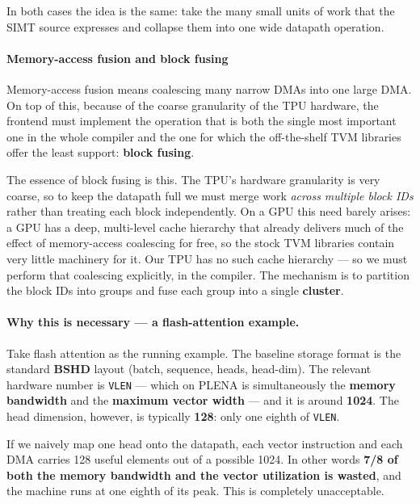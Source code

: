 \documentclass[
  10pt,
]{article}
\begin{document}
In both cases the idea is the same: take the many small units of work
that the SIMT source expresses and collapse them into one wide datapath
operation.

\paragraph{Memory-access fusion and block
fusing}\label{frontend-memory-access-fusion}

Memory-access fusion means coalescing many narrow DMAs into one large
DMA. On top of this, because of the coarse granularity of the TPU
hardware, the frontend must implement the operation that is both the
single most important one in the whole compiler and the one for which
the off-the-shelf TVM libraries offer the least support: \textbf{block
fusing}.

The essence of block fusing is this. The TPU's hardware granularity is
very coarse, so to keep the datapath full we must merge work \emph{across
multiple block IDs} rather than treating each block independently. On a
GPU this need barely arises: a GPU has a deep, multi-level cache
hierarchy that already delivers much of the effect of memory-access
coalescing for free, so the stock TVM libraries contain very little
machinery for it. Our TPU has no such cache hierarchy --- so we must
perform that coalescing explicitly, in the compiler. The mechanism is to
partition the block IDs into groups and fuse each group into a single
\textbf{cluster}.

\paragraph{Why this is necessary --- a flash-attention
example.}\label{frontend-why-block-fusing}

Take flash attention as the running example. The baseline storage format
is the standard \textbf{BSHD} layout (batch, sequence, heads, head-dim).
The relevant hardware number is \texttt{VLEN} --- which on PLENA is
simultaneously the \textbf{memory bandwidth} and the \textbf{maximum
vector width} --- and it is around \textbf{1024}. The head dimension,
however, is typically \textbf{128}: only one eighth of \texttt{VLEN}.

If we naively map one head onto the datapath, each vector instruction and
each DMA carries 128 useful elements out of a possible 1024. In other
words \textbf{7/8 of both the memory bandwidth and the vector utilization
is wasted}, and the machine runs at one eighth of its peak. This is
completely unacceptable.
\end{document}
